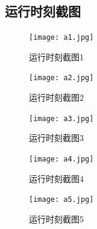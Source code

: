 \documentclass[lang=cn,11pt]{elegantpaper}
\begin{document}
 \subsection{运行时刻截图}

 \begin{figure}[H]
	\centering
	\texttt{[image: a1.jpg]}
	\caption{运行时刻截图1 \label{fig:feature-out}}
\end{figure} 


\begin{figure}[H]
	\centering
	\texttt{[image: a2.jpg]}
	\caption{运行时刻截图2 \label{fig:feature-out}}
\end{figure} 

\begin{figure}[H]
	\centering
	\texttt{[image: a3.jpg]}
	\caption{运行时刻截图3 \label{fig:feature-out}}
\end{figure} 

\begin{figure}[H]
	\centering
	\texttt{[image: a4.jpg]}
	\caption{运行时刻截图4 \label{fig:feature-out}}
\end{figure} 

\begin{figure}[H]
	\centering
	\texttt{[image: a5.jpg]}
	\caption{运行时刻截图5 \label{fig:feature-out}}
\end{figure} 
\end{document}
